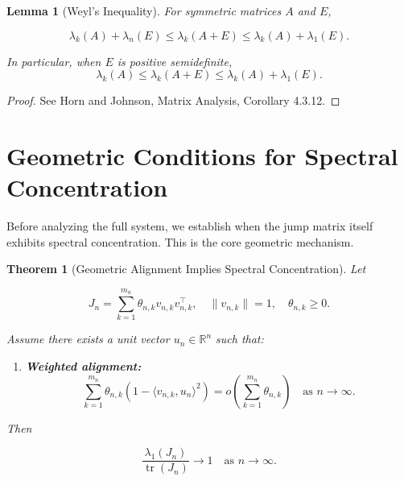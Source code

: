 \documentclass{article}
\newtheorem{theorem}{Theorem}
\newtheorem{lemma}{Lemma}
\begin{document}
\begin{lemma}[Weyl's Inequality]
For symmetric matrices \(A\) and \(E\),

\[
\lambda_k(A) + \lambda_n(E) \le \lambda_k(A+E) \le \lambda_k(A) + \lambda_1(E).
\]

In particular, when \(E\) is positive semidefinite,
\[
\lambda_k(A) \le \lambda_k(A+E) \le \lambda_k(A) + \lambda_1(E).
\]

\end{lemma}

\begin{proof}
See Horn and Johnson, Matrix Analysis, Corollary 4.3.12.
\end{proof}

\section{Geometric Conditions for Spectral Concentration}

Before analyzing the full system, we establish when the jump matrix itself exhibits spectral concentration. This is the core geometric mechanism.

\begin{theorem}[Geometric Alignment Implies Spectral Concentration]
Let

\[
J_n = \sum_{k=1}^{m_n} \theta_{n,k} v_{n,k} v_{n,k}^\top, \quad \|v_{n,k}\| = 1, \quad \theta_{n,k} \ge 0.
\]

Assume there exists a unit vector \(u_n \in \mathbb{R}^n\) such that:

\begin{enumerate}
\item \textbf{Weighted alignment:}
\[
\sum_{k=1}^{m_n} \theta_{n,k} \left(1 - \langle v_{n,k}, u_n \rangle^2 \right) = o\left(\sum_{k=1}^{m_n} \theta_{n,k}\right) \quad \text{as } n \to \infty.
\]
\end{enumerate}

Then

\[
\frac{\lambda_1(J_n)}{\operatorname{tr}(J_n)} \to 1 \quad \text{as } n \to \infty.
\]

\end{theorem}
\end{document}
